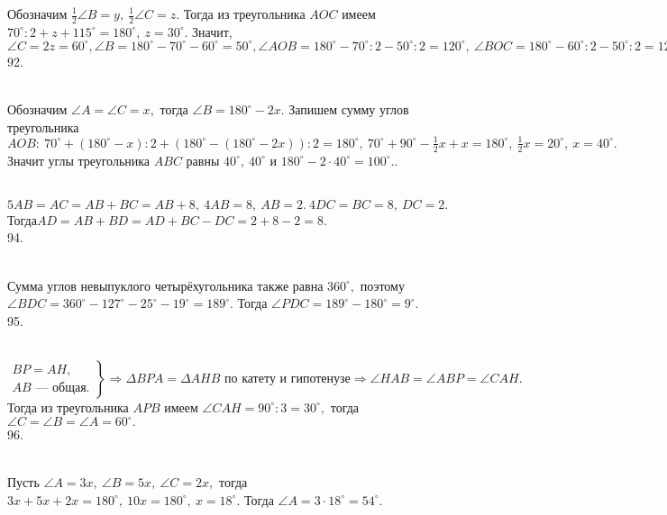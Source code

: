 Обозначим $\frac{1}{2}\angle B=y,\ \frac{1}{2}\angle C=z.$ Тогда из треугольника $AOC$ имеем $70^\circ:2+z+115^\circ=180^\circ,\ z=30^\circ.$ Значит, $\angle C=2z=60^\circ, \angle B=180^\circ-70^\circ-60^\circ=50^\circ, \angle AOB=180^\circ-70^\circ:2-50^\circ:2=120^\circ,\ \angle BOC=180^\circ-60^\circ:2-50^\circ:2=125^\circ.$\\
92. \begin{figure}[ht!]
\end{figure}\\
Обозначим $\angle A=\angle C=x,$ тогда $\angle B=180^\circ-2x.$ Запишем сумму углов треугольника $AOB:\ 70^\circ+(180^\circ-x):2+(180^\circ-(180^\circ-2x)):2=180^\circ,\ 70^\circ +90^\circ-\frac{1}{2}x+x=180^\circ,\ \frac{1}{2}x=20^\circ,\ x=40^\circ.$ Значит углы треугольника $ABC$ равны $40^\circ,\ 40^\circ$ и $180^\circ-2\cdot40^\circ=100^\circ.$\newpage{}. \begin{figure}[ht!]
\end{figure}\\
$5AB=AC=AB+BC=AB+8,\ 4AB=8,\ AB=2.\ 4DC=BC=8,\ DC=2.$ Тогда$AD=AB+BD=AD+BC-DC=2+8-2=8.$\\
94. \begin{figure}[ht!]
\end{figure}\\
Сумма углов невыпуклого четырёхугольника также равна $360^\circ,$ поэтому $\angle BDC=360^\circ-127^\circ-25^\circ-19^\circ=189^\circ.$ Тогда $\angle PDC=189^\circ-180^\circ=9^\circ.$\\
95. \begin{figure}[ht!]
\end{figure}\\
$\left.\begin{array}{l}BP=AH,\\
AB\text{ --- общая.} \end{array}\right\}\Rightarrow \Delta BPA=\Delta AHB\text{ по катету и гипотенузе}\Rightarrow \angle HAB=\angle ABP=\angle CAH.$ Тогда из треугольника $APB$ имеем $\angle CAH=90^\circ:3=30^\circ,$ тогда $\angle C=\angle B=\angle A=60^\circ.$\\
96. \begin{figure}[ht!]
\end{figure}\\
Пусть $\angle A=3x,\ \angle B=5x,\ \angle C=2x,$ тогда $3x+5x+2x=180^\circ,\ 10x=180^\circ,\ x=18^\circ.$ Тогда $\angle A=3\cdot18^\circ=54^\circ.$
